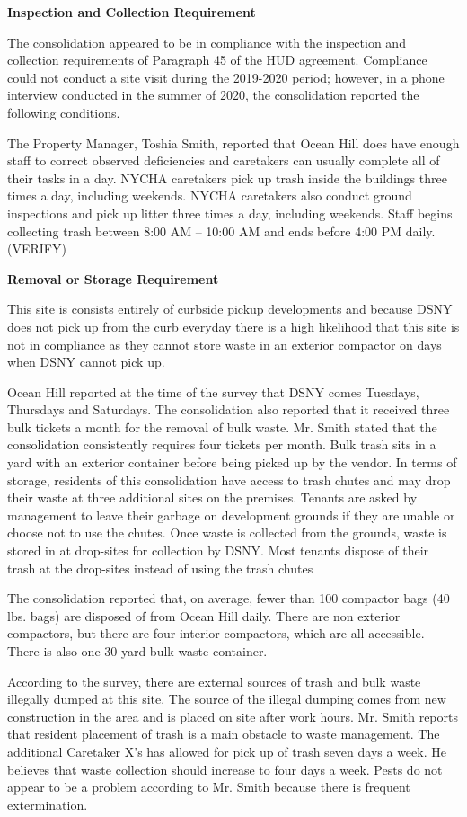 
\textbf{Inspection and Collection Requirement}

The consolidation appeared to be in compliance with the inspection and collection requirements of Paragraph 45 of the HUD agreement. Compliance could not conduct a site visit during the 2019-2020 period; however, in a phone interview conducted in the summer of 2020, the consolidation reported the following conditions.

The Property Manager, Toshia Smith, reported that Ocean Hill does have enough staff to correct observed deficiencies and caretakers can usually complete all of their tasks in a day. NYCHA caretakers pick up trash inside the buildings three times a day, including weekends. NYCHA caretakers also conduct ground inspections and pick up litter three times a day, including weekends. Staff begins collecting trash between 8:00 AM -- 10:00 AM and ends before 4:00 PM daily. (VERIFY)

\textbf{Removal or Storage Requirement}

This site is consists entirely of curbside pickup developments and because DSNY does not pick up from the curb everyday there is a high likelihood that this site is not in compliance as they cannot store waste in an exterior compactor on days when DSNY cannot pick up.

Ocean Hill reported at the time of the survey that DSNY comes Tuesdays, Thursdays and Saturdays. The consolidation also reported that it received three bulk tickets a month for the removal of bulk waste. Mr. Smith stated that the consolidation consistently requires four tickets per month. Bulk trash sits in a yard with an exterior container before being picked up by the vendor. In terms of storage, residents of this consolidation have access to trash chutes and may drop their waste at three additional sites on the premises. Tenants are asked by management to leave their garbage on development grounds if they are unable or choose not to use the chutes. Once waste is collected from the grounds, waste is stored in at drop-sites for collection by DSNY. Most tenants dispose of their trash at the drop-sites instead of using the trash chutes

The consolidation reported that, on average, fewer than 100 compactor bags (40 lbs. bags)  are disposed of from Ocean Hill daily. There are non exterior compactors, but there are four interior compactors, which are all accessible. There is also one 30-yard bulk waste container.

According to the survey, there are external sources of trash and bulk waste illegally dumped at this site. The source of the illegal dumping comes from new construction in the area and is placed on site after work hours. Mr. Smith reports that resident placement of trash is a main obstacle to waste management. The additional Caretaker X's has allowed for pick up of trash seven days a week. He believes that waste collection should increase to four days a week. Pests do not appear to be a problem according to Mr. Smith because there is frequent extermination.